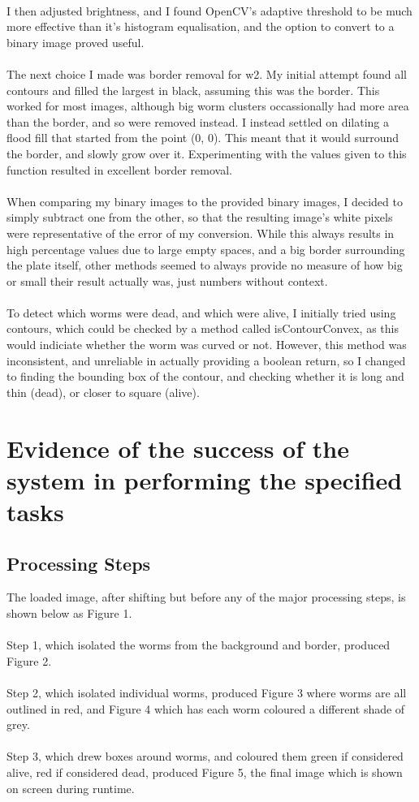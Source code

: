 \documentclass[a4paper,12pt]{article}
\begin{document}
\\
I then adjusted brightness, and I found OpenCV's adaptive threshold to be much more effective than it's histogram equalisation, and the option to convert to a binary image proved useful.
\\\\
The next choice I made was border removal for w2. My initial attempt found all contours and filled the largest in black, assuming this was the border. This worked for most images, although big worm clusters occassionally had more area than the border, and so were removed instead. I instead settled on dilating a flood fill that started from the point (0, 0). This meant that it would surround the border, and slowly grow over it. Experimenting with the values given to this function resulted in excellent border removal.
\\\\
When comparing my binary images to the provided binary images, I decided to simply subtract one from the other, so that the resulting image's white pixels were representative of the error of my conversion. While this always results in high percentage values due to large empty spaces, and a big border surrounding the plate itself, other methods seemed to always provide no measure of how big or small their result actually was, just numbers without context.
\\\\
To detect which worms were dead, and which were alive, I initially tried using contours, which could be checked by a method called isContourConvex, as this would indiciate whether the worm was curved or not. However, this method was inconsistent, and unreliable in actually providing a boolean return, so I changed to finding the bounding box of the contour, and checking whether it is long and thin (dead), or closer to square (alive).

\section*{Evidence of the success of the system in performing the specified tasks}
\subsection*{Processing Steps}
The loaded image, after shifting but before any of the major processing steps, is shown below as Figure 1.
\\\\
Step 1, which isolated the worms from the background and border, produced Figure 2.
\\\\
Step 2, which isolated individual worms, produced Figure 3 where worms are all outlined in red, and Figure 4 which has each worm coloured a different shade of grey.
\\\\
Step 3, which drew boxes around worms, and coloured them green if considered alive, red if considered dead, produced Figure 5, the final image which is shown on screen during runtime.
\end{document}
